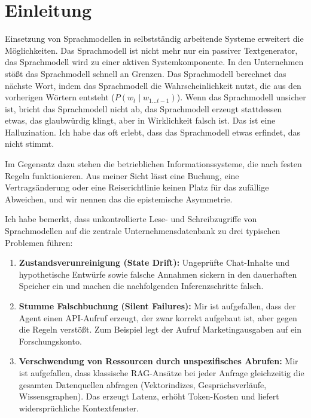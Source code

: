 \documentclass[10pt,journal,compsoc]{IEEEtran}
\begin{document}
\maketitle
\IEEEdisplaynontitleabstractindextext
\IEEEpeerreviewmaketitle

\section{Einleitung}
\label{sec:einleitung}

 Einsetzung von Sprachmodellen in selbstständig arbeitende Systeme erweitert die Möglichkeiten. Das Sprachmodell ist nicht mehr nur ein passiver Textgenerator, das Sprachmodell wird zu einer aktiven Systemkomponente. In den Unternehmen stößt das Sprachmodell schnell an Grenzen. Das Sprachmodell berechnet das nächste Wort, indem das Sprachmodell die Wahrscheinlichkeit nutzt, die aus den vorherigen Wörtern entsteht ($P(w_{t} \mid w_{1 \dots t-1})$). Wenn das Sprachmodell unsicher ist, bricht das Sprachmodell nicht ab, das Sprachmodell erzeugt stattdessen etwas, das glaubwürdig klingt, aber in Wirklichkeit falsch ist. Das ist eine Halluzination. Ich habe das oft erlebt, dass das Sprachmodell etwas erfindet, das nicht stimmt.

Im Gegensatz dazu stehen die betrieblichen Informationssysteme, die nach festen Regeln funktionieren. Aus meiner Sicht lässt eine Buchung, eine Vertragsänderung oder eine Reiserichtlinie keinen Platz für das zufällige Abweichen, und wir nennen das die epistemische Asymmetrie.

Ich habe bemerkt, dass unkontrollierte Lese- und Schreibzugriffe von Sprachmodellen auf die zentrale Unternehmensdatenbank zu drei typischen Problemen führen:
\begin{enumerate}
    \item \textbf{Zustandsverunreinigung (State Drift):} Ungeprüfte Chat-Inhalte und hypothetische Entwürfe sowie falsche Annahmen sickern in den dauerhaften Speicher ein und machen die nachfolgenden Inferenzschritte falsch.
    \item \textbf{Stumme Falschbuchung (Silent Failures):} Mir ist aufgefallen, dass der Agent einen API-Aufruf erzeugt, der zwar korrekt aufgebaut ist, aber gegen die Regeln verstößt. Zum Beispiel legt der Aufruf Marketingausgaben auf ein Forschungskonto.
    \item \textbf{Verschwendung von Ressourcen durch unspezifisches Abrufen:} Mir ist aufgefallen, dass klassische RAG-Ansätze bei jeder Anfrage gleichzeitig die gesamten Datenquellen abfragen (Vektorindizes, Gesprächsverläufe, Wissensgraphen). Das erzeugt Latenz, erhöht Token-Kosten und liefert widersprüchliche Kontextfenster.
\end{enumerate}
\end{document}
